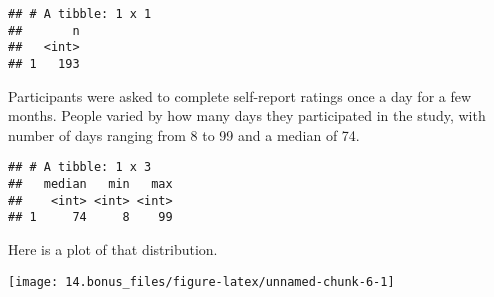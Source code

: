 \documentclass[]{article}
\newenvironment{Shaded}{\begin{snugshade}}{\end{snugshade}}
\newcommand{\DataTypeTok}[1]{\textcolor[rgb]{0.13,0.29,0.53}{#1}}
\newcommand{\DecValTok}[1]{\textcolor[rgb]{0.00,0.00,0.81}{#1}}
\newcommand{\KeywordTok}[1]{\textcolor[rgb]{0.13,0.29,0.53}{\textbf{#1}}}
\newcommand{\NormalTok}[1]{#1}
\newcommand{\OperatorTok}[1]{\textcolor[rgb]{0.81,0.36,0.00}{\textbf{#1}}}
\newcommand{\OtherTok}[1]{\textcolor[rgb]{0.56,0.35,0.01}{#1}}
\newcommand{\StringTok}[1]{\textcolor[rgb]{0.31,0.60,0.02}{#1}}
\begin{document}
\begin{verbatim}
## # A tibble: 1 x 1
##       n
##   <int>
## 1   193
\end{verbatim}

Participants were asked to complete self-report ratings once a day for a
few months. People varied by how many days they participated in the
study, with number of days ranging from 8 to 99 and a median of 74.

\begin{Shaded}
\end{Shaded}

\begin{verbatim}
## # A tibble: 1 x 3
##   median   min   max
##    <int> <int> <int>
## 1     74     8    99
\end{verbatim}

Here is a plot of that distribution.

\begin{Shaded}
\end{Shaded}

\begin{center}\texttt{[image: 14.bonus\_files/figure-latex/unnamed-chunk-6-1]} \end{center}
\end{document}
